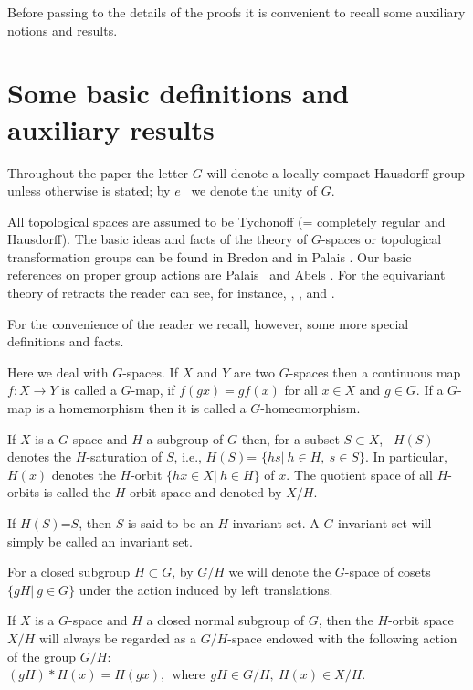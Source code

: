 \documentclass{amsart}
\begin{document}
 \medskip
Before passing to the details of the proofs it is convenient to recall some auxiliary notions and results.
 
\medskip



\section {Some basic definitions and auxiliary results}

Throughout the paper the letter $G$ will denote a locally compact Hausdorff group unless otherwise is stated; by $e$ \ we  denote the unity of $G$. 

All topological spaces  are assumed to be Tychonoff (= completely regular and Hausdorff). 
The basic ideas and facts of the theory of $G$-spaces or topological
transformation groups can be found in Bredon \cite{bre:72} and in  Palais \cite{pal:60}.  
Our basic references on  proper group actions are   Palais~\cite{pal:61} and Abels   \cite{abe:78}.        
For the  equivariant theory of retracts the reader can see, for instance, \cite{ant:87},  \cite{ant:88} \cite{ant:99}, \cite{ant:jap} and \cite{ant:proper}. 

For the  convenience of the reader we recall, however,  some more  special definitions and facts.

\smallskip

Here we deal with $G$-spaces. If $X$ and $Y$ are two $G$-spaces then a continuous map $f:X\to Y$ is called a $G$-map, if $f(gx)=gf(x)$ for all $x\in X$ and $g\in G$. If a $G$-map is a homemorphism then it is called a $G$-homeomorphism. 




If $X$ is a $G$-space and $H$ a subgroup of $G$ then, for a subset $S\subset X$, \ $H(S)$ denotes the $H$-saturation of $S$, i.e., $H(S)$= $\{hs | \ h\in H,\ s\in S\}$. In particular, $H(x)$  denotes the $H$-orbit $\{hx\in X | \ h\in H \}$ of $x$.  The quotient space  of all $H$-orbits is called the $H$-orbit space and denoted by $X/H$. 

If $H(S)$=$S$, then $S$ is said to be an $H$-invariant set. A  $G$-invariant set will simply be called an invariant set.  

For a closed subgroup $H \subset G$, by $G/H$ we will denote the $G$-space 
of cosets $\{gH | \ g\in G\}$ under the action induced by left translations.

If $X$ is a $G$-space and $H$  a closed normal subgroup of $G$, then the $H$-orbit space $X/H$  will always be regarded as a  $G/H$-space endowed with the following action of the group $G/H$:
$(gH)*H(x)=H(gx), \ \ \text{where} \ \ gH\in G/H, \ H(x)\in X/H$.
\end{document}
